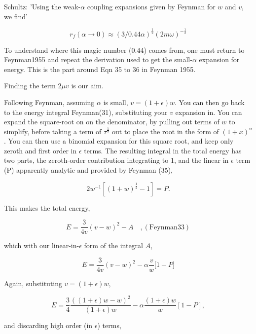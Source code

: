 \documentclass[twocolumn,11pt]{article}
\begin{document}
Schultz: 'Using the weak-$\alpha$ coupling expansions given by Feynman for $w$
and $v$, we find'

\begin{equation}
    r_f (\alpha\rightarrow 0) \approx (3/0.44\alpha)^{\frac{1}{2}} (2m\omega)^{-\frac{1}{2}}
\end{equation}

To understand where this magic number (0.44) comes from, one must return
to Feynman1955 and repeat the derivation used to get the
small-$\alpha$ expansion for energy. 
This is the part around Eqn 35 to 36 in Feynman 1955.

Finding the term $2\mu v$ is our aim.

Following Feynman, assuming $\alpha$ is small, $v=(1+\epsilon)w$.
You can then go back to the energy integral Feynman(31), substituting
your $v$ expansion in. You can expand the square-root on on the
denominator, by pulling out terms of $w$ to simplify, before taking a
term of $\tau^{\frac{1}{2}}$ out to place the root in the form of
$(1+x)^n$. You can then use a binomial expansion for this square root,
and keep only zeroth and first order in $\epsilon$ terms. The
resulting integral in the total energy has two parts, the zeroth-order
contribution integrating to 1, and the linear in $\epsilon$ term (P)
apparently analytic and provided by Feynman (35),

\begin{equation}
    2w^{-1} [ (1+w)^{\frac{1}{2}} - 1] = P .
\end{equation}

This makes the total energy,

\begin{equation}
    E=\frac{3}{4v}(v-w)^2-A 
    \quad \mathrm{, (Feynman33)}
\end{equation}

which with our linear-in-$\epsilon$ form of the integral $A$,

\begin{equation}
    E = \frac{3}{4v}(v-w)^2 - \alpha \frac{v}{w} {[}1-P{]}
\end{equation}

Again, substituting $v=(1+\epsilon)w$,

\begin{equation}
    E=\frac{3}{4}\frac{((1+\epsilon)w - w)^2}{(1+\epsilon)w}
       - \alpha\frac{(1+\epsilon)w}{w} [1-P], 
\end{equation}

and discarding high order (in $\epsilon$) terms,
\end{document}
